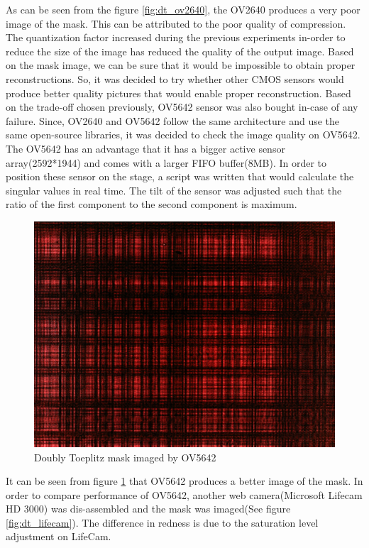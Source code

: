 As can be seen from the figure \ref{fig:dt_ov2640}, the OV2640 produces a very poor image of the mask. This can be attributed to the poor quality of compression. The quantization factor increased during the previous experiments in-order to reduce the size of the image has reduced the quality of the output image. Based on the mask image, we can be sure that it would be impossible to obtain proper reconstructions. So, it was decided to try whether other CMOS sensors would produce better quality pictures that would enable proper reconstruction. Based on the trade-off chosen previously, OV5642 sensor was also bought in-case of any failure. Since, OV2640 and OV5642 follow the same architecture and use the same open-source libraries, it was decided to check the image quality on OV5642. The OV5642 has an advantage that it has a bigger active sensor array(2592*1944) and comes with a larger FIFO buffer(8MB). In order to position these sensor on the stage, a script was written that would calculate the singular values in real time. The tilt of the sensor was adjusted such that the ratio of the first component to the second component is maximum. 
\begin{figure}[h]
\centering
\includegraphics[scale=0.125]{pics/slm/ov5642dtmask.jpg}
\caption{Doubly Toeplitz mask imaged by OV5642}
\label{fig:dt_ov5642}
\end{figure}
It can be seen from figure \ref{fig:dt_ov5642} that OV5642 produces a better image of the mask. In order to compare performance of OV5642, another web camera(Microsoft Lifecam HD 3000) was dis-assembled and the mask was imaged(See figure \ref{fig:dt_lifecam}). The difference in redness is due to the saturation level adjustment on LifeCam.
